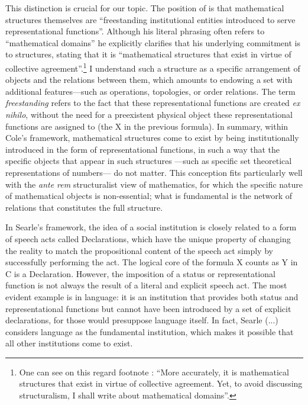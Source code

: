 \documentclass[11pt,a4paper]{article}
\begin{document}
This distinction is crucial for our topic. The position of \textcite[1]{Cole2013} is that mathematical structures themselves are “freestanding institutional entities introduced to serve representational functions”. Although his literal phrasing often refers to “mathematical domains” he explicitly clarifies that his underlying commitment is to structures, stating that it is “mathematical structures that exist in virtue of collective agreement”.\footnote{One can see on this regard footnote \textcite[1]{Cole2013}: “More accurately, it is mathematical structures that exist in virtue of collective agreement. Yet, to avoid discussing structuralism, I shall write about mathematical domains”.} I understand such a structure as a specific arrangement of objects and the relations between them, which amounts to endowing a set with additional features—such as operations, topologies, or order relations. The term \textit{freestanding} refers to the fact that these representational functions are created \textit{ex nihilo}, without the need for a preexistent physical object these representational functions are assigned to (the $\mathrm{X}$ in the previous formula). In summary, within Cole's framework, mathematical structures come to exist by being institutionally introduced in the form of representational functions, in such a way that the specific objects that appear in such structures —such as specific set theoretical representations of numbers— do not matter. This conception fits particularly well with the \textit{ante rem} structuralist view of mathematics, for which the specific nature of mathematical objects is non-essential; what is fundamental is the network of relations that constitutes the full structure. 

In Searle's framework, the idea of a social institution is closely related to a form of speech acts called Declarations, which have the unique property of changing the reality to match the propositional content of the speech act simply by successfully performing the act. The logical core of the formula $\mathrm{X}$ counts as $\mathrm{Y}$ in $\mathrm{C}$ is a Declaration. However, the imposition of a status or representational function is not always the result of a literal and explicit speech act. The most evident example is in language: it is an institution that provides both status and representational functions but cannot have been introduced by a set of explicit declarations, for those would presuppose language itself. In fact, Searle (...) considers language as the fundamental institution, which makes it possible that all other institutions come to exist.  
\end{document}
